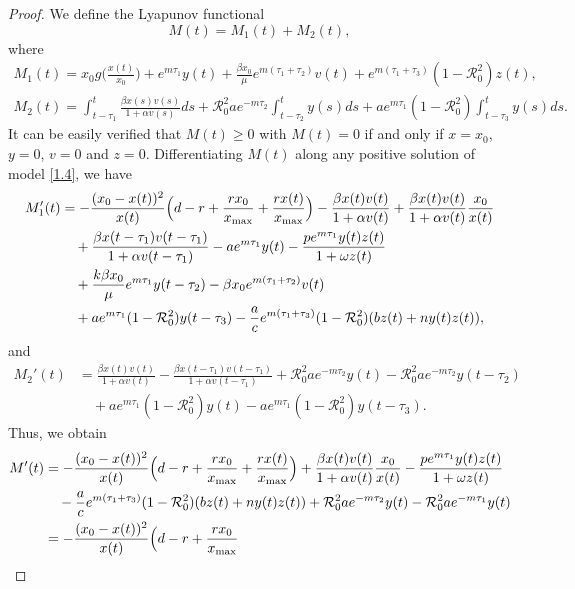 \documentclass[reqno]{amsart}
\begin{document}
\begin{proof}
We define the Lyapunov functional 
$$
M(t)=M_{1}(t)+M_{2}(t),
$$
where
\begin{gather*}
M_{1}(t)=x_0 g\Big(\frac{x(t)}{x_0}\Big)
+e^{m\tau_1}y(t)+\frac{\beta x_0}{\mu}e^{m(\tau_1+\tau_2)}v(t)
+e^{m(\tau_1+\tau_3)}(1-\mathcal{R}_0^{2})z(t),
\\
M_{2}(t)=\int _{t-\tau_{1}}^{t}\frac{\beta x(s)v(s)}{1+\alpha v(s)}ds
+\mathcal{R}_0^{2}ae^{-m\tau_2}\int_{t-\tau_{2}}^{t}y(s)ds
+ae^{m\tau_1}(1-\mathcal{R}_0^{2}) \int _{t-\tau_{3}}^{t}y(s)ds.
\end{gather*}
It can be easily verified that $M(t)\geq 0$ with  $M(t)= 0$ if and only if 
$x=x_0$, $y=0$, $v=0$ and $z=0$.
 Differentiating $M(t)$ along  any positive solution of model \eqref{1.4}, we have
\begin{align*}
M_{1}'(t)
&= -\frac{(x_0-x(t))^{2}}{x(t)}\Big(d-r+\frac{rx_0}{x_{\rm max}}
 +\frac{rx(t)}{x_{\rm max}}\Big)-\frac{\beta x(t)v(t)}{1+\alpha v(t)}
 +\frac{\beta x(t)v(t)}{1+\alpha v(t)}\frac{x_0}{x(t)} \\
&\quad +\frac{\beta x(t-\tau_{1})v(t-\tau_{1})}{1+\alpha v(t-\tau_{1})}
 -ae^{m\tau_1}y(t)-\frac{pe^{m\tau_{1}} y(t)z(t)}{1+\omega z(t)}\\
&\quad +\frac{k\beta x_0}{\mu}e^{m\tau_1}y(t-\tau_{2})-\beta x_0e^{m(\tau_1+\tau_2)}v(t) \\
&\quad +ae^{m\tau_1}(1-\mathcal{R}_0^{2})y(t-\tau_{3})
 -\frac{a}{c}e^{m(\tau_1+\tau_3)}(1-\mathcal{R}_0^{2})(bz(t)+ny(t)z(t)),
\end{align*}
and
\begin{align*}
M_{2}'(t)
&= \frac{\beta x(t)v(t)}{1+\alpha v(t)}
 -\frac{\beta x(t-\tau_{1})v(t-\tau_{1})}{1+\alpha v(t-\tau_{1})}
+\mathcal{R}_0^{2}ae^{-m\tau_2}y(t)-\mathcal{R}_0^{2}ae^{-m\tau_2}y(t-\tau_{2})\\
&\quad +ae^{m\tau_1}(1-\mathcal{R}_0^{2})y(t)-ae^{m\tau_1}
 (1-\mathcal{R}_0^{2})y(t-\tau_{3}).
\end{align*}
Thus,  we obtain
\begin{align*}
M'(t)&= -\frac{(x_0-x(t))^{2}}{x(t)}\Big(d-r+\frac{rx_0}{x_{\rm max}}
 +\frac{rx(t)}{x_{\rm max}}\Big)+\frac{\beta x(t)v(t)}{1+\alpha v(t)}\frac{x_0}{x(t)}
-\frac{pe^{m\tau_{1}} y(t)z(t)}{1+\omega z(t)}\\
&\quad -\frac{a}{c}e^{m(\tau_1+\tau_3)}(1-\mathcal{R}_0^{2})(bz(t)+ny(t)z(t))
 +\mathcal{R}_0^{2}ae^{-m\tau_2}y(t)-\mathcal{R}_0^{2}ae^{-m\tau_1}y(t)\\
&= -\frac{(x_0-x(t))^{2}}{x(t)}\Big(d-r+\frac{rx_0}{x_{\rm max}}

\end{align*}
\end{proof}
\end{document}
